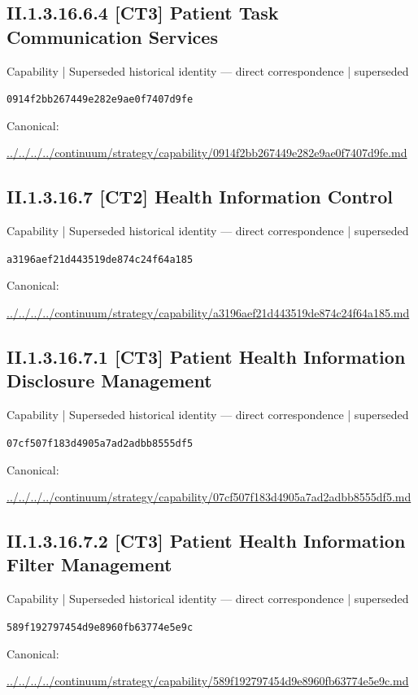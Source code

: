 \documentclass[10pt,a4paper]{article}
\begin{document}
\subsection*{II.1.3.16.6.4 [CT3] Patient Task Communication Services}
{\small Capability | Superseded historical identity — direct correspondence | superseded}\par
\texttt{0914f2bb267449e282e9ae0f7407d9fe}\par
Canonical: \par
{\footnotesize\url{../../../../continuum/strategy/capability/0914f2bb267449e282e9ae0f7407d9fe.md}}\par
\subsection*{II.1.3.16.7 [CT2] Health Information Control}
{\small Capability | Superseded historical identity — direct correspondence | superseded}\par
\texttt{a3196aef21d443519de874c24f64a185}\par
Canonical: \par
{\footnotesize\url{../../../../continuum/strategy/capability/a3196aef21d443519de874c24f64a185.md}}\par
\subsection*{II.1.3.16.7.1 [CT3] Patient Health Information Disclosure Management}
{\small Capability | Superseded historical identity — direct correspondence | superseded}\par
\texttt{07cf507f183d4905a7ad2adbb8555df5}\par
Canonical: \par
{\footnotesize\url{../../../../continuum/strategy/capability/07cf507f183d4905a7ad2adbb8555df5.md}}\par
\subsection*{II.1.3.16.7.2 [CT3] Patient Health Information Filter Management}
{\small Capability | Superseded historical identity — direct correspondence | superseded}\par
\texttt{589f192797454d9e8960fb63774e5e9c}\par
Canonical: \par
{\footnotesize\url{../../../../continuum/strategy/capability/589f192797454d9e8960fb63774e5e9c.md}}\par
\end{document}
